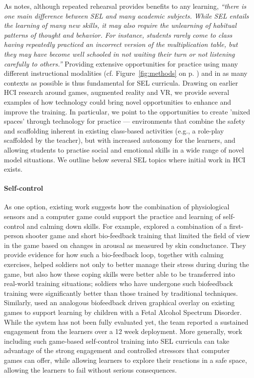 \documentclass[prodmode,acmtochi]{acmsmall}
\newcommand{\inqq}[1]{\textrm{\textit{``#1''}}}
\begin{document}
 As \cite[p. 55]{Elias1997} notes, although repeated rehearsal  provides benefits to any learning, \inqq{there is one main difference between SEL and many academic subjects. While SEL entails the learning of many new skills, it may also require the unlearning of habitual patterns of thought and behavior. For instance, students rarely come to class having repeatedly practiced an incorrect version of the multiplication table, but they may have become well schooled in not waiting their turn or not listening carefully to others.} Providing extensive opportunities for practice using many different instructional modalities (cf. Figure~\ref{fig:methods} on p. \pageref{fig:methods}) and in as many contexts as possible \cite{ref,ref} is thus fundamental for SEL curricula. 
%
Drawing on earlier HCI research around games, augmented reality and VR, we provide several examples of how technology could bring novel opportunities to enhance and improve the training. In particular, we point to the opportunities to create 'mixed spaces' through technology for practice --- environments that combine the safety and scaffolding inherent in existing class-based activities (e.g., a role-play scaffolded by the teacher), but with increased autonomy for the learners, and allowing students to practise social and emotional skills in a wide range of novel model situations. We outline below several SEL topics where initial work in HCI exists. 

\paragraph{Self-control} As one option, existing work suggests how the combination of physiological sensors and a computer game could support the practice and learning of self-control and calming down skills. For example,  explored a combination of a first-person shooter game and short bio-feedback training that limited the field of view in the game based on changes in arousal as measured by skin conductance. They provide evidence for how such a bio-feedback loop, together with calming exercises, helped soldiers not only to better manage their stress during during the game, but also how these coping skills were better able to be transferred into real-world training situations; soldiers who have undergone such biofeedback training were significantly better than those trained by traditional techniques. Similarly,  used an analogous biofeedback driven graphical overlay on existing games to support learning by children with a Fetal Alcohol Spectrum Disorder. While the system has not been fully evaluated yet, the team reported a sustained engagement from the learners over a 12 week deployment. More generally, work  including such game-based self-control training into SEL curricula can take advantage of the strong engagement and controlled stressors that computer games can offer, while allowing learners to explore their reactions in a safe space, allowing the learners to fail without serious consequences.  
\end{document}
